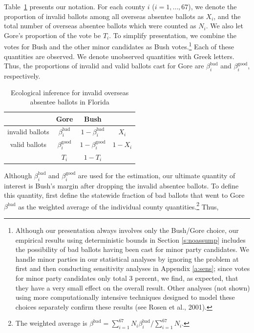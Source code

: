 \documentclass[11pt,titlepage]{article}
\newcommand{\bb}{\beta^{\text{bad}}}
\newcommand{\bg}{\beta^{\text{good}}}
\begin{document}
Table~\ref{tb:ei} presents our notation.  For each county $i$
($i=1,\dots,67$), we denote the proportion of invalid ballots among
all overseas absentee ballots as $X_i$, and the total number of
overseas absentee ballots which were counted as $N_i$.  We also let
Gore's proportion of the vote be $T_i$.  To simplify presentation, we
combine the votes for Bush and the other minor candidates as Bush
votes.\footnote{Although our presentation always involves only the
  Bush/Gore choice, our empirical results using deterministic bounds
  in Section \ref{s:noassump} includes the possibility of bad ballots
  having been cast for minor party candidates.  We handle minor
  parties in our statistical analyses by ignoring the problem at first
  and then conducting sensitivity analyses in Appendix \ref{a:sens};
  since votes for minor party candidates only total 3 percent, we
  find, as expected, that they have a very small effect on the overall
  result.  Other analyses (not shown) using more computationally
  intensive techniques designed to model these choices separately
  confirm these results (see Rosen et al., 2001)\nocite{RosJaiKin01}.}
Each of these quantities are observed.  We denote unobserved
quantities with Greek letters.  Thus, the proportions of invalid and
valid ballots cast for Gore are $\bb_i$ and $\bg_i$, respectively.
\begin{table}[t]
\begin{center}
\begin{tabular}{cccc}
                & Gore  & Bush &         \\
\hline 
invalid ballots & $\bb_i$  & $1-\bb_i$ & $X_i$   \\
valid ballots   & $\bg_i$  & $1-\bg_i$ & $1-X_i$ \\
\hline
                & $T_i$ & $1-T_i$ &         \\
\end{tabular} \caption{Ecological inference for invalid overseas
  absentee ballots in Florida}\label{tb:ei}
\end{center}
\end{table} 

Although $\bb_i$ and $\bg_i$ are used for the estimation, our ultimate
quantity of interest is Bush's margin after dropping the invalid
absentee ballots.  To define this quantity, first define the statewide
fraction of bad ballots that went to Gore $\bb$ as the weighted
average of the individual county quantities.\footnote{The weighted
  average is $\bb=\sum_{i=1}^{67}N_i\bb_i/\sum_{i=1}^{67}N_i$.}  Thus,
\end{document}

